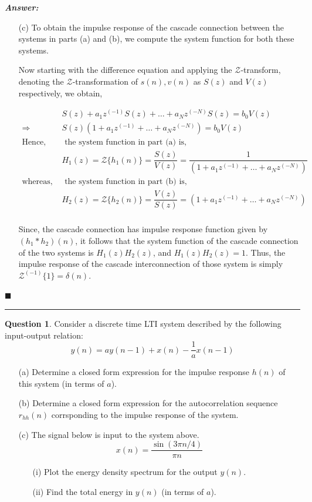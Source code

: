 \documentclass[12pt]{article}
\theoremstyle{definition}
\newtheorem{question}{Question}
\newenvironment{answer}{
    \textbf{\textit{Answer:}} \qquad
}{\hfill $\blacksquare$ \\ 

\begin{center}
    \rule{0.8\linewidth}{1.5px} 
    \vspace*{1cm}   
\end{center}
}
\newcommand{\zcal}{\mathcal{Z}}
\newcommand{\inv}[1][1]{^{(- #1)}}
\begin{document}
\begin{answer}
\begin{enumerate}
        \item[(c)] To obtain the impulse response of the cascade connection between the systems in parts (a) and (b), we compute the system function for both these systems.
        
        Now starting with the difference equation and applying the $\zcal$-transform, denoting the $\zcal$-transformation of $s(n), v(n)$ as $S(z)$ and $V(z)$ respectively, we obtain,

        \begin{align*}
            & S(z) + a_1 z\inv S(z) + \dots + a_N z\inv[N] S(z) = b_0 V(z)\\
            \Rightarrow \qquad & S(z) ( 1 + a_1 z\inv + \dots + a_N z\inv[N]) = b_0 V(z)\\
            \text{Hence, } & \text{ the system function in part (a) is,}\\
            & H_1(z) = \zcal\{ h_1(n)\} = \dfrac{S(z)}{V(z)} = \dfrac{1}{( 1 + a_1 z\inv + \dots + a_N z\inv[N])}\\
            \text{whereas, } & \text{ the system function in part (b) is,}\\
            & H_2(z) = \zcal\{ h_2(n)\} = \dfrac{V(z)}{S(z)} = ( 1 + a_1 z\inv + \dots + a_N z\inv[N])\\
        \end{align*}

        Since, the cascade connection has impulse response function given by $(h_1\ast h_2)(n)$, it follows that the system function of the cascade connection of the two systems is $H_1(z)H_2(z)$, and $H_1(z)H_2(z) = 1$. Thus, the impulse response of the cascade interconnection of those system is simply $\zcal\inv\{ 1 \} = \delta(n)$.


    \end{enumerate}
\end{answer}


\begin{question}
    Consider a discrete time LTI system described by the following input-output relation:
    $$
    y(n) = ay(n-1) + x(n) - \dfrac{1}{a} x(n-1)
    $$
    \begin{enumerate}
        \item[(a)] Determine a closed form expression for the impulse response $h(n)$ of this system (in terms of $a$).
        \item[(b)] Determine a closed form expression for the autocorrelation sequence $r_{hh}(n)$ corrsponding to the impulse response of the system.
        \item[(c)] The signal below is input to the system above.
        $$
        x(n) = \dfrac{\sin (3\pi n / 4)}{\pi n}
        $$   
        \begin{enumerate}
            \item[(i)] Plot the energy density spectrum for the output $y(n)$.
            \item[(ii)] Find the total energy in $y(n)$ (in terms of $a$). 
        \end{enumerate}
    \end{enumerate}
\end{question}
\end{document}
